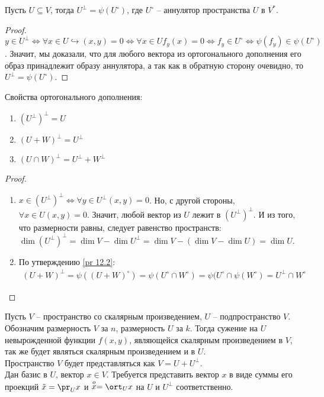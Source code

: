\begin{proposition}
\label{pr 12.2}
    Пусть $U \subseteq V$, тогда $U^{\perp} = \psi (U^{\circ})$, где $U^{\circ}$ -- аннулятор пространства $U$ в $V^*$.
\end{proposition}

\begin{proof}
    $y \in U^{\perp} \Leftrightarrow \forall x \in U \hookrightarrow (x, y) = 0 \Leftrightarrow \forall x \in U f_y(x) = 0 \Leftrightarrow f_y \in U^{\circ} \Leftrightarrow \psi(f_y) \in \psi(U^{\circ})$. Значит, мы доказали, что для любого вектора из ортогонального дополнения его образ принадлежит образу аннулятора, а так как в обратную сторону очевидно, то $U^{\perp} = \psi(U^{\circ})$.
\end{proof}

\begin{proposition}
    Свойства ортогонального дополнения:
    \begin{enumerate}
        \item $(U^{\perp})^{\perp} = U$
        \item $(U + W)^{\perp} = U^{\perp}$
        \item $(U \cap W)^{\perp} = U^{\perp} + W^{\perp}$
    \end{enumerate}
\end{proposition}

\begin{proof}
    \begin{enumerate}
        \item $x \in (U^{\perp})^{\perp} \Leftrightarrow \forall y \in U^{\perp} (x, y) = 0$. Но, с другой стороны, $\forall x \in U (x, y) = 0$. Значит, любой вектор из $U$ лежит в $(U^{\perp})^{\perp}$. И из того, что размерности равны, следует равенство пространств: $\dim (U^{\perp})^{\perp} = \dim V - \dim U^{\perp} = \dim V - (\dim V - \dim U) = \dim U$.
        \item По утверждению \ref{pr 12.2}: 
        \begin{gather*}
            (U + W)^{\perp} = \psi((U + W)^{\circ}) = \psi(U^{\circ} \cap W^{\circ}) = \psi(U^{\circ} \cap \psi(W^{\circ}) = U^{\perp} \cap W^{\circ}
        \end{gather*}
    \end{enumerate}
\end{proof}

\begin{problem}
    Пусть $V$ -- пространство со скалярным произведением, $U$ -- подпространство $V$. Обозначим 
    размерность $V$ за $n$, размерность $U$ за $k$. Тогда сужение на $U$
    невырожденной функции $f(x, y)$, являющейся скалярным произведением в $V$, так же будет являться
    скалярным произведением и в $U$. \\
    Пространство $V$ будет представляться как $V = U + U^{\perp}$. \\
    Дан базис в $U$, вектор $x \in V$. Требуется представить вектор $x$ в виде суммы его проекций 
    $\tilde{x} = \pr_U x$ и $\stackrel{o}{x} = \ort_U x$ на $U$ и $U^{\perp}$ соответственно.
\end{problem}

